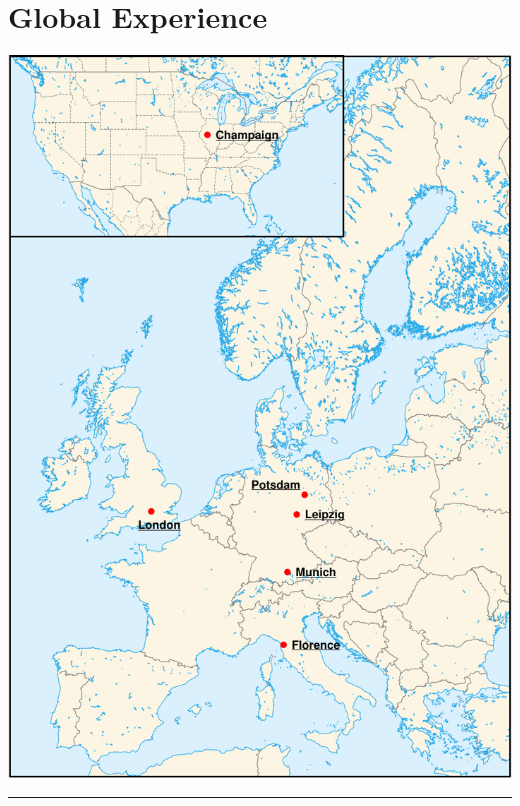 \documentclass{article}
\begin{document}
\begin{minipage}[t]{0.3\textwidth}
	\centering
	\section*{\hfill \fontsize{18pt}{24pt}\selectfont \color{pblue} Global Experience}
	\vspace{-2mm}
	\includegraphics[scale=0.3]{img/globalEXPeng.pdf}
	\vspace{2mm}
	\hrule
	\vspace{-3mm}

\end{minipage}
\end{document}
